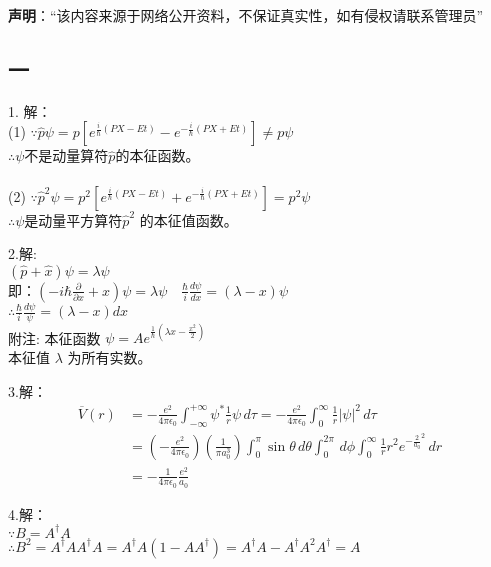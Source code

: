 
\textbf{声明}：“该内容来源于网络公开资料，不保证真实性，如有侵权请联系管理员”


\subsection{一}
1. 解：\\
(1) $\because \hat{p} \psi = p\left[e^{\frac{i}{\hbar}(PX - Et)} - e^{-\frac{i}{\hbar}(PX + Et)}\right] \neq p\psi$\\
 $\therefore \psi$不是动量算符$\hat{p}$的本征函数。\\\\
(2) $\because \hat{p}^2 \psi = p^2\left[e^{\frac{i}{\hbar}(PX - Et)} + e^{-\frac{i}{\hbar}(PX + Et)}\right] = p^2\psi$ \\
$\therefore \psi$是动量平方算符$\hat{p}^2$ 的本征值函数。 

2.解:\\
$(\hat{p} + \hat{x})\psi = \lambda \psi$\\
即：$(-i\hbar\frac{\partial}{\partial x} + x)\psi = \lambda \psi \quad \frac{\hbar}{i} \frac{d\psi}{dx} = (\lambda - x)\psi$ \\
$\therefore \frac{\hbar}{i} \frac{d\psi}{\psi} = (\lambda - x)dx$\\
附注: 本征函数 $\psi = Ae^{\frac{1}{\hbar}(\lambda x - \frac{x^2}{2})}$ \\
      本征值 $\lambda$ 为所有实数。

3.解：
\begin{align}
\overline{V}(r) &= -\frac{e^2}{4 \pi \epsilon_0} \int_{-\infty}^{+\infty} \psi^* \frac{1}{r} \psi \, d\tau 
= -\frac{e^2}{4 \pi \epsilon_0} \int_0^\infty \frac{1}{r} |\psi|^2 \, d\tau\\
&= \left( -\frac{e^2}{4 \pi \epsilon_0} \right) \left( \frac{1}{\pi a_0^3} \right) \int_0^\pi \sin \theta \, d\theta \int_0^{2\pi} \, d\phi \int_0^\infty \frac{1}{r} r^2 e^{-\frac{2}{a_0}^2} \, dr\\
&= -\frac{1}{4 \pi \epsilon_0} \frac{e^2}{a_0}~
\end{align}

4.解：\\
$\because B = A^\dagger A$\\
$\therefore B^2 = A^\dagger A A^\dagger A = A^\dagger A \left(1 - AA^\dagger \right) = A^\dagger A - A^\dagger A^2 A^\dagger=A$


